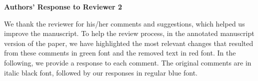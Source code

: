 \documentclass{article}
\begin{document}





\newpage

\begin{center}
	\bf
	\large
	Authors' Response to Reviewer 2
\end{center}

\noindent
We thank the reviewer for his/her comments and suggestions, which helped us improve the manuscript. To help the review process, in the annotated manuscript version of the paper, we have highlighted the most relevant changes that resulted from these comments in green font and the removed text in red font. In the following, we provide a response to each comment. The original comments are in italic black font, followed by our responses in regular blue font.
\vspace{2ex}
\newline
\end{document}
